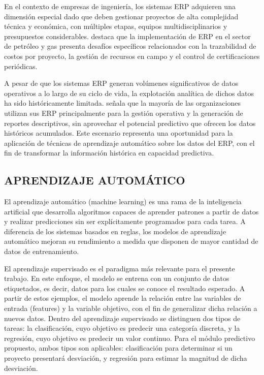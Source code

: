 \documentclass{univalle-perfil}
\begin{document}
En el contexto de empresas de ingeniería, los sistemas ERP adquieren una dimensión especial dado que deben gestionar proyectos de alta complejidad técnica y económica, con múltiples etapas, equipos multidisciplinarios y presupuestos considerables. \textcite{Rashid2019} destaca que la implementación de ERP en el sector de petróleo y gas presenta desafíos específicos relacionados con la trazabilidad de costos por proyecto, la gestión de recursos en campo y el control de certificaciones periódicas.

A pesar de que los sistemas ERP generan volúmenes significativos de datos operativos a lo largo de su ciclo de vida, la explotación analítica de dichos datos ha sido históricamente limitada. \textcite{MLdrivenERP2023} señala que la mayoría de las organizaciones utilizan sus ERP principalmente para la gestión operativa y la generación de reportes descriptivos, sin aprovechar el potencial predictivo que ofrecen los datos históricos acumulados. Este escenario representa una oportunidad para la aplicación de técnicas de aprendizaje automático sobre los datos del ERP, con el fin de transformar la información histórica en capacidad predictiva.

\subsection{APRENDIZAJE AUTOMÁTICO}

El aprendizaje automático (machine learning) es una rama de la inteligencia artificial que desarrolla algoritmos capaces de aprender patrones a partir de datos y realizar predicciones sin ser explícitamente programados para cada tarea. A diferencia de los sistemas basados en reglas, los modelos de aprendizaje automático mejoran su rendimiento a medida que disponen de mayor cantidad de datos de entrenamiento.

El aprendizaje supervisado es el paradigma más relevante para el presente trabajo. En este enfoque, el modelo se entrena con un conjunto de datos etiquetados, es decir, datos para los cuales se conoce el resultado esperado. A partir de estos ejemplos, el modelo aprende la relación entre las variables de entrada (features) y la variable objetivo, con el fin de generalizar dicha relación a nuevos datos. Dentro del aprendizaje supervisado se distinguen dos tipos de tareas: la clasificación, cuyo objetivo es predecir una categoría discreta, y la regresión, cuyo objetivo es predecir un valor continuo. Para el módulo predictivo propuesto, ambos tipos son aplicables: clasificación para determinar si un proyecto presentará desviación, y regresión para estimar la magnitud de dicha desviación.
\end{document}
